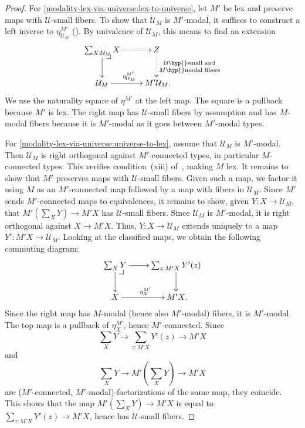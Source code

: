 \documentclass[10pt,a4paper,draft]{article}
\makeatletter
\newcommand{\UU}{\mathcal{U}}%
\renewcommand{\~}{\widetilde}
\newcounter{diagram}
\newcommand{\pullback}[1]{\save*!/#1-1.2pc/#1:(-1,1)@^{|-}\restore}
\theoremstyle{definition}
\theoremstyle{remark} %
\makeatother
\begin{document}
\begin{proof}
For \cref{modality-lex-via-universe:lex-to-universe}, let $M'$ be lex and preserve maps with $\UU$\hyp{}small fibers.
To show that $\UU_M$ is $M'$\hyp{}modal, it suffices to construct a left inverse to $\eta^{M'}_{\UU_M}$ (\cite[Lemma~1.20]{RijkeSS17}).
By univalence of $\UU_M$, this means to find an extension
\[
\xymatrix{
  \textstyle\sum_{X:\UU_M} X
  \ar@{.>}[r]
  \ar[d]
  \pullback{dr}
&
  Z
  \ar@{.>}[d]^{\txt\scriptsize{$\UU$\hyp{}small and\\ $M$\hyp{}modal fibers}}
\\
  \UU_M
  \ar[r]^{\eta^{M'}_{\UU_M}}
&
  M' \UU_M
\rlap{.}}
\]
We use the naturality square of $\eta^{M'}$ at the left map.
The square is a pullback because $M'$ is lex.
The right map has $\UU$\hyp{}small fibers by assumption and has $M$\hyp{}modal fibers because it is $M'$\hyp{}modal as it goes between $M'$\hyp{}modal types.

For \cref{modality-lex-via-universe:universe-to-lex}, assume that $\UU_M$ is $M'$\hyp{}modal.
Then $\UU_M$ is right orthogonal against $M'$\hyp{}connected types, in particular $M$\hyp{}connected types.
This verifies condition~(xiii) of~\cite[Theorem~3.1]{RijkeSS17}, making $M$ lex.
It remains to show that $M'$ preserves maps with $\UU$\hyp{}small fibers.
Given such a map, we factor it using $M$ as an $M'$\hyp{}connected map followed by a map with fibers in $\UU_M$.
Since $M'$ sends $M'$\hyp{}connected maps to equivalences, it remains to show, given $Y : X \to \UU_M$, that $M'(\sum_X Y) \to M'X$ has $\UU$\hyp{}small fibers.
Since $\UU_M$ is $M'$\hyp{}modal, it is right orthogonal against $X \to M'X$.
Thus, $Y : X \to \UU_M$ extends uniquely to a map $Y' : M'X \to \UU_M$.
Looking at the classified maps, we obtain the following commuting diagram:
\[
\xymatrix{
  \textstyle\sum_X Y
  \ar[r]
  \ar[d]
  \pullback{dr}
&
  \textstyle\sum_{z:M'X} Y'(z)
  \ar[d]
\\
  X
  \ar[r]^{\eta^{M'}_X}
&
  M'X
\rlap{.}}
\]
Since the right map has $M$\hyp{}modal (hence also $M'$\hyp{}modal) fibers, it is $M'$\hyp{}modal.
The top map is a pullback of $\eta^{M'}_X$, hence $M'$\hyp{}connected.
Since
\[
\textstyle\sum_X Y \longrightarrow \textstyle\sum_{z:M'X} Y'(z) \longrightarrow M'X
\]
and
\[
\textstyle\sum_X Y \longrightarrow M'(\textstyle\sum_X Y) \longrightarrow M'X
\]
are ($M'$\hyp{}connected, $M'$\hyp{}modal)\hyp{}factorizations of the same map, they coincide.
This shows that the map $M'(\sum_X Y) \to M'X$ is equal to $\sum_{z:M'X} Y'(z) \to M'X$, hence has $\UU$\hyp{}small fibers.
\end{proof}
\end{document}
